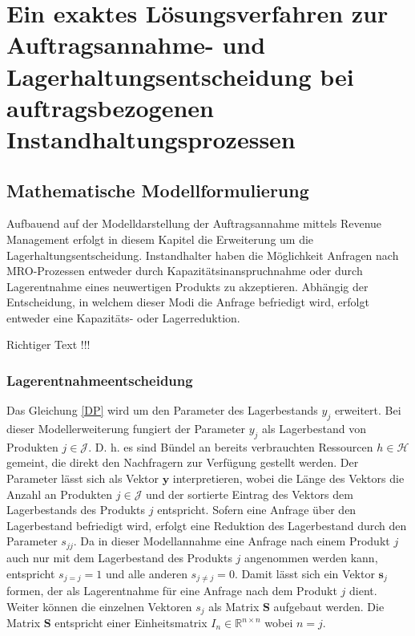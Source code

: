 \chapter{Ein exaktes Lösungsverfahren zur Auftragsannahme- und Lagerhaltungsentscheidung bei auftragsbezogenen Instandhaltungsprozessen}
\setcounter{footnote}{7}

\section{Mathematische Modellformulierung}

Aufbauend auf der Modelldarstellung der Auftragsannahme mittels Revenue Management erfolgt in diesem Kapitel die Erweiterung um die Lagerhaltungsentscheidung. Instandhalter haben die Möglichkeit Anfragen nach MRO-Prozessen entweder durch Kapazitätsinanspruchnahme oder durch Lagerentnahme eines neuwertigen Produkts zu akzeptieren. Abhängig der Entscheidung, in welchem dieser Modi die Anfrage befriedigt wird, erfolgt entweder eine Kapazitäts- oder Lagerreduktion.

Richtiger Text !!!

\subsection{Lagerentnahmeentscheidung}

Das Gleichung \eqref{DP} wird um den Parameter des Lagerbestands $y_{j}$ erweitert. Bei dieser Modellerweiterung fungiert der Parameter $y_{j}$ als Lagerbestand von Produkten $j\in\mathcal{J}$. D. h. es sind Bündel an bereits verbrauchten Ressourcen $h\in\mathcal{H}$ gemeint, die direkt den Nachfragern zur Verfügung gestellt werden. Der Parameter lässt sich als Vektor $\textbf{y}$ interpretieren, wobei die Länge des Vektors die Anzahl an Produkten $j\in\mathcal{J}$ und der sortierte Eintrag des Vektors dem Lagerbestands des Produkts $j$ entspricht. Sofern eine Anfrage über den Lagerbestand befriedigt wird, erfolgt eine Reduktion des Lagerbestand durch den Parameter $s_{jj}$. Da in dieser Modellannahme eine Anfrage nach einem Produkt $j$ auch nur mit dem Lagerbestand des Produkts $j$ angenommen werden kann, entspricht $s_{j=j}=1$ und alle anderen $s_{j\neq j}=0$. Damit lässt sich ein Vektor $\textbf{s}_j$ formen, der als Lagerentnahme für eine Anfrage nach dem Produkt $j$ dient. Weiter können die einzelnen Vektoren $s_{j}$ als Matrix $\textbf{S}$ aufgebaut werden. Die Matrix $\textbf{S}$ entspricht einer Einheitsmatrix $I_{n}\in\mathbb{R}^{n\times n}$ wobei $n=j$.


